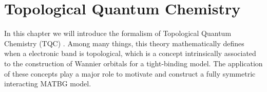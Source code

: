 



\chapter{Topological Quantum Chemistry}

In this chapter we will introduce the formalism of Topological Quantum Chemistry (TQC) \cite{topological_quantum_chemistry2017, building_blocks2018, lectures_tms2017}. Among many things, this theory mathematically defines when a electronic band is topological, which is a concept intrinsically associated to the construction of Wannier orbitals for a tight-binding model. The application of these concepts play a major role to motivate and construct a fully symmetric interacting MATBG model.

